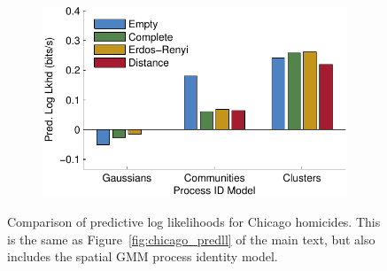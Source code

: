 \begin{figure}[!h]
\begin{center}
\begin{subfigure}[T]{.85\linewidth}
\includegraphics[width=\linewidth]{figures/ch2/icpsr_pred_ll_gaussians}
\end{subfigure}
\end{center}
\caption{Comparison of predictive log likelihoods for Chicago homicides. This is the same as Figure~\ref{fig:chicago_predll} of the main text, but also includes the spatial GMM process identity model.}
\label{fig:chicago_pred_ll_gaussian}
\end{figure}



